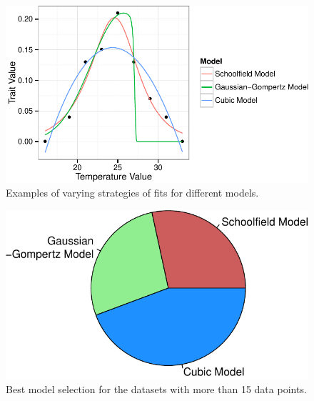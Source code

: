 \documentclass[11pt]{article}
\begin{document}
\begin{figure}[h]
\begin{center}
\includegraphics[scale = 1]{poor_cubic.pdf}
\caption{Examples of varying strategies of fits for different models. }
\label{fig:poor_cubic}
\end{center}
\end{figure}
\begin{figure}[h]
\begin{center}
\includegraphics[scale = 1]{high.pdf}
\caption{Best model selection for the datasets with more than 15 data points.}
\label{fig:high}
\end{center}
\end{figure}
\end{document}
